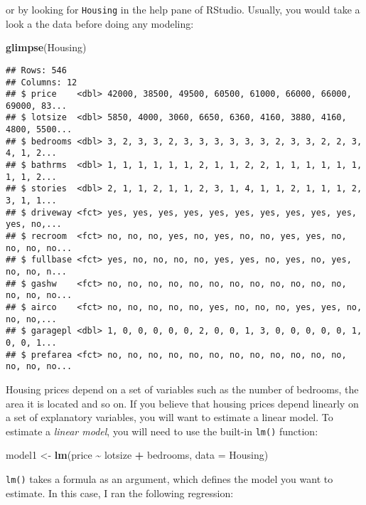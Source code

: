 \documentclass[
]{article}
\newenvironment{Shaded}{\begin{snugshade}}{\end{snugshade}}
\newcommand{\DataTypeTok}[1]{\textcolor[rgb]{0.13,0.29,0.53}{#1}}
\newcommand{\KeywordTok}[1]{\textcolor[rgb]{0.13,0.29,0.53}{\textbf{#1}}}
\newcommand{\NormalTok}[1]{#1}
\newcommand{\OperatorTok}[1]{\textcolor[rgb]{0.81,0.36,0.00}{\textbf{#1}}}
\newcommand{\StringTok}[1]{\textcolor[rgb]{0.31,0.60,0.02}{#1}}
\begin{document}
or by looking for \texttt{Housing} in the help pane of RStudio. Usually, you would take a look a the data
before doing any modeling:

\begin{Shaded}
\begin{Highlighting}[]
\KeywordTok{glimpse}\NormalTok{(Housing)}
\end{Highlighting}
\end{Shaded}

\begin{verbatim}
## Rows: 546
## Columns: 12
## $ price    <dbl> 42000, 38500, 49500, 60500, 61000, 66000, 66000, 69000, 83...
## $ lotsize  <dbl> 5850, 4000, 3060, 6650, 6360, 4160, 3880, 4160, 4800, 5500...
## $ bedrooms <dbl> 3, 2, 3, 3, 2, 3, 3, 3, 3, 3, 3, 2, 3, 3, 2, 2, 3, 4, 1, 2...
## $ bathrms  <dbl> 1, 1, 1, 1, 1, 1, 2, 1, 1, 2, 2, 1, 1, 1, 1, 1, 1, 1, 1, 2...
## $ stories  <dbl> 2, 1, 1, 2, 1, 1, 2, 3, 1, 4, 1, 1, 2, 1, 1, 1, 2, 3, 1, 1...
## $ driveway <fct> yes, yes, yes, yes, yes, yes, yes, yes, yes, yes, yes, no,...
## $ recroom  <fct> no, no, no, yes, no, yes, no, no, yes, yes, no, no, no, no...
## $ fullbase <fct> yes, no, no, no, no, yes, yes, no, yes, no, yes, no, no, n...
## $ gashw    <fct> no, no, no, no, no, no, no, no, no, no, no, no, no, no, no...
## $ airco    <fct> no, no, no, no, no, yes, no, no, no, yes, yes, no, no, no,...
## $ garagepl <dbl> 1, 0, 0, 0, 0, 0, 2, 0, 0, 1, 3, 0, 0, 0, 0, 0, 1, 0, 0, 1...
## $ prefarea <fct> no, no, no, no, no, no, no, no, no, no, no, no, no, no, no...
\end{verbatim}

Housing prices depend on a set of variables such as the number of bedrooms, the area it is located
and so on. If you believe that housing prices depend linearly on a set of explanatory variables,
you will want to estimate a linear model. To estimate a \emph{linear model}, you will need to use the
built-in \texttt{lm()} function:

\begin{Shaded}
\begin{Highlighting}[]
\NormalTok{model1 \textless{}{-}}\StringTok{ }\KeywordTok{lm}\NormalTok{(price }\OperatorTok{\textasciitilde{}}\StringTok{ }\NormalTok{lotsize }\OperatorTok{+}\StringTok{ }\NormalTok{bedrooms, }\DataTypeTok{data =}\NormalTok{ Housing)}
\end{Highlighting}
\end{Shaded}

\texttt{lm()} takes a formula as an argument, which defines the model you want to estimate. In this case,
I ran the following regression:
\end{document}
